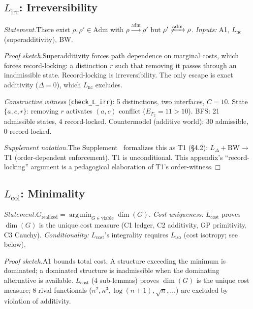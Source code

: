 \documentclass[11pt]{article}
\providecommand{\square}{\ensuremath{\mdlgwhtsquare}}
\newcommand{\Adm}{\mathrm{Adm}}
\newcommand{\Lnc}{L_{\mathrm{nc}}}
\newcommand{\Lirr}{L_{\mathrm{irr}}}
\newcommand{\Lcol}{L_{\mathrm{col}}}
\DeclareMathOperator*{\argmin}{arg\,min}
\begin{document}
\subsection{\texorpdfstring{$L_{\mathrm{irr}}$}{Lirr}: Irreversibility}

\begin{tcolorbox}[apfbox, title={Lemma $\Lirr$ (Irreversibility) --- Statement and Sketch}]
\textit{Statement.}\quad There exist $\rho, \rho' \in \Adm$ with $\rho \xrightarrow{\mathrm{adm}} \rho'$ but $\rho' \not\xrightarrow{\mathrm{adm}} \rho$.
\textit{Inputs:} A1, $\Lnc$ (superadditivity), BW.
\end{tcolorbox}

\noindent\textit{Proof sketch.}\quad Superadditivity forces path dependence on marginal costs, which forces record-locking: a distinction $r$ such that removing it passes through an inadmissible state.  Record-locking is irreversibility.  The only escape is exact additivity ($\Delta = 0$), which $L_{\mathrm{nc}}$ excludes.

\textit{Constructive witness} (\texttt{check\_L\_irr}): 5 distinctions, two interfaces, $C = 10$.  State $\{a,c,r\}$: removing $r$ activates $(a,c)$ conflict ($E_{\Gamma_2} = 11 > 10$).  BFS: 21 admissible states, 4 record-locked.  Countermodel (additive world): 30 admissible, 0 record-locked.

\textit{Supplement notation.}\quad The Supplement~\cite{Supp} formalizes this as T1 (§4.2): $L_\Delta + \mathrm{BW} \to$ T1 (order-dependent enforcement).  T1 is unconditional.  This appendix's ``record-locking'' argument is a pedagogical elaboration of T1's order-witness. \hfill$\square$


\subsection{\texorpdfstring{$L_{\mathrm{col}}$}{Lcol}: Minimality}

\begin{tcolorbox}[apfbox, title={Lemma $\Lcol$ (Minimality) --- Statement and Sketch}]
\textit{Statement.}\quad $G_{\mathrm{realized}} = \argmin_{G \in \mathrm{viable}} \dim(G)$.
\textit{Cost uniqueness:} $L_{\mathrm{cost}}$ proves $\dim(G)$ is the unique cost measure (C1 ledger, C2 additivity, GP primitivity, C3 Cauchy).
\textit{Conditionality:} $L_{\mathrm{cost}}$'s integrality requires $L_{\mathrm{iso}}$ (cost isotropy; see below).
\end{tcolorbox}

\noindent\textit{Proof sketch.}\quad A1 bounds total cost.  A structure exceeding the minimum is dominated; a dominated structure is inadmissible when the dominating alternative is available.  $L_{\mathrm{cost}}$ (4 sub-lemmas) proves $\dim(G)$ is the unique cost measure; 8 rival functionals ($n^2, n^3, \log(n{+}1), \sqrt{n}, \ldots$) are excluded by violation of additivity.
\end{document}
